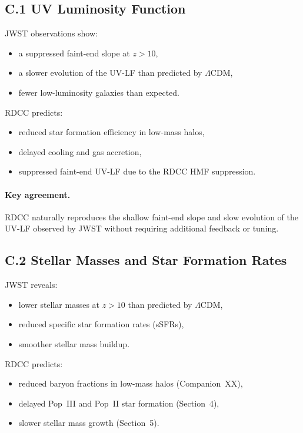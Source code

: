 \documentclass[11pt,a4paper]{article}
\begin{document}
\subsection*{C.1 UV Luminosity Function}

JWST observations show:

\begin{itemize}
    \item a suppressed faint-end slope at $z > 10$,
    \item a slower evolution of the UV-LF than predicted by $\Lambda$CDM,
    \item fewer low-luminosity galaxies than expected.
\end{itemize}

RDCC predicts:

\begin{itemize}
    \item reduced star formation efficiency in low-mass halos,
    \item delayed cooling and gas accretion,
    \item suppressed faint-end UV-LF due to the RDCC HMF suppression.
\end{itemize}

\paragraph{Key agreement.}
RDCC naturally reproduces the shallow faint-end slope and slow evolution of the UV-LF observed 
by JWST without requiring additional feedback or tuning.

\subsection*{C.2 Stellar Masses and Star Formation Rates}

JWST reveals:

\begin{itemize}
    \item lower stellar masses at $z > 10$ than predicted by $\Lambda$CDM,
    \item reduced specific star formation rates (sSFRs),
    \item smoother stellar mass buildup.
\end{itemize}

RDCC predicts:

\begin{itemize}
    \item reduced baryon fractions in low-mass halos (Companion~XX),
    \item delayed Pop~III and Pop~II star formation (Section~4),
    \item slower stellar mass growth (Section~5).
\end{itemize}
\end{document}
